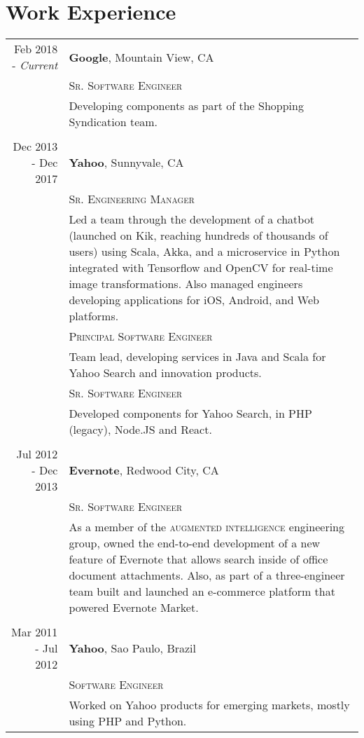 \documentclass[a4paper,10pt]{article}
\begin{document}
\section{Work Experience}
\begin{tabular}{r|p{14cm}}
Feb 2018 - \emph{Current} & \textbf{Google}\footnotemark,
                                Mountain View, CA
\\ &\textsc{Sr. Software Engineer}\\&

 Developing components as part of the Shopping Syndication team.

 \\

 \multicolumn{2}{c}{} \\

Dec 2013 - Dec 2017 & \textbf{Yahoo}\footnotemark,
                                Sunnyvale, CA
\\ &\textsc{Sr. Engineering Manager}\\&

 Led a team through the development of a chatbot (launched on Kik, reaching
 hundreds of thousands of users) using Scala, Akka, and a microservice in Python
 integrated with Tensorflow and OpenCV for real-time image transformations.
 Also managed engineers developing applications for iOS, Android, and Web
 platforms.

 \\
 &\textsc{Principal Software Engineer}\\&

 Team lead, developing services in Java and Scala for Yahoo Search
 and innovation products.

 \\
 &\textsc{Sr. Software Engineer}\\&

 Developed components for Yahoo Search, in PHP (legacy), Node.JS and React.

 \\

 \multicolumn{2}{c}{} \\

 Jul 2012 - Dec 2013 & \textbf{Evernote}, Redwood City, CA \\
 &\textsc{Sr. Software Engineer}\\&

 As a member of the \textsc{augmented intelligence} engineering group, owned
 the end-to-end development of a new feature of Evernote that allows search
 inside of office document attachments. Also, as part of a three-engineer team
 built and launched an e-commerce platform that powered Evernote Market.

 \\
 \multicolumn{2}{c}{} \\

 Mar 2011 - Jul 2012 & \textbf{Yahoo}\footnotemark[1], Sao Paulo, Brazil \\
 &\textsc{Software Engineer}\\&

 Worked on Yahoo products for emerging markets, mostly using PHP and Python.

\end{tabular}
\end{document}

